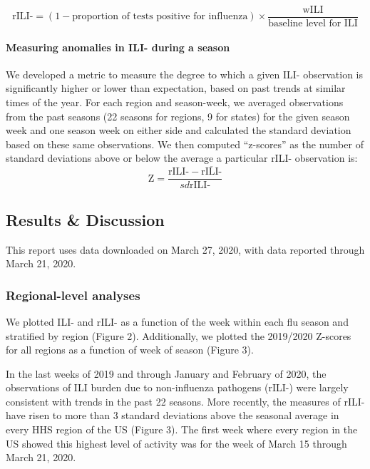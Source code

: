 \documentclass[]{article}
\let\oldparagraph\paragraph
\renewcommand{\paragraph}[1]{\oldparagraph{#1}\mbox{}}
\begin{document}
\[\text{rILI-} = (1 - \text{proportion of tests positive for influenza}) \times \frac{\text{wILI}}{\text{baseline level for ILI}}\]

\hypertarget{measuring-anomalies-in-ili--during-a-season}{%
\paragraph{Measuring anomalies in ILI- during a
season}\label{measuring-anomalies-in-ili--during-a-season}}

We developed a metric to measure the degree to which a given ILI-
observation is significantly higher or lower than expectation, based on
past trends at similar times of the year. For each region and
season-week, we averaged observations from the past seasons (22 seasons
for regions, 9 for states) for the given season week and one season week
on either side and calculated the standard deviation based on these same
observations. We then computed ``z-scores'' as the number of standard
deviations above or below the average a particular rILI- observation is:
\[\text{Z} =  \frac{\text{rILI-} - \overline{\text{rILI-}}}{sd{\text{rILI-}}}\]

\hypertarget{results-discussion}{%
\subsection{Results \& Discussion}\label{results-discussion}}

This report uses data downloaded on March 27, 2020, with data reported
through March 21, 2020.

\hypertarget{regional-level-analyses}{%
\subsubsection{Regional-level analyses}\label{regional-level-analyses}}

We plotted ILI- and rILI- as a function of the week within each flu
season and stratified by region (Figure 2). Additionally, we plotted the
2019/2020 Z-scores for all regions as a function of week of season
(Figure 3).

In the last weeks of 2019 and through January and February of 2020, the
observations of ILI burden due to non-influenza pathogens (rILI-) were
largely consistent with trends in the past 22 seasons. More recently,
the measures of rILI- have risen to more than 3 standard deviations
above the seasonal average in every HHS region of the US (Figure 3). The
first week where every region in the US showed this highest level of
activity was for the week of March 15 through March 21, 2020.
\end{document}
